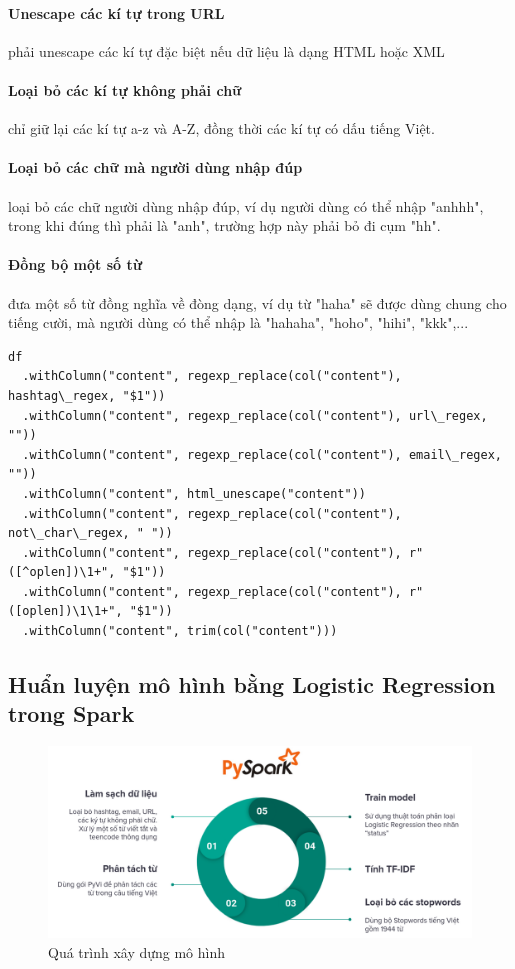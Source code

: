 \documentclass[runningheads]{llncs}
\begin{document}
\paragraph{Unescape các kí tự trong URL} phải unescape các kí tự đặc biệt nếu dữ liệu là dạng HTML hoặc XML
\paragraph{Loại bỏ các kí tự không phải chữ} chỉ giữ lại các kí tự a-z và A-Z, đồng thời các kí tự có dấu tiếng Việt.
\paragraph{Loại bỏ các chữ mà người dùng nhập đúp} loại bỏ các chữ người dùng nhập đúp, ví dụ người dùng có thể nhập "anhhh", trong khi đúng thì phải là "anh", trường hợp này phải bỏ đi cụm "hh".
\paragraph{Đồng bộ một số từ} đưa một số từ đồng nghĩa về đòng dạng, ví dụ từ "haha" sẽ được dùng chung cho tiếng cười, mà người dùng có thể nhập là "hahaha", "hoho", "hihi", "kkk",...

\begin{lstlisting}
df
  .withColumn("content", regexp_replace(col("content"), hashtag\_regex, "$1"))
  .withColumn("content", regexp_replace(col("content"), url\_regex, ""))
  .withColumn("content", regexp_replace(col("content"), email\_regex, ""))
  .withColumn("content", html_unescape("content"))
  .withColumn("content", regexp_replace(col("content"), not\_char\_regex, " "))
  .withColumn("content", regexp_replace(col("content"), r"([^oplen])\1+", "$1"))
  .withColumn("content", regexp_replace(col("content"), r"([oplen])\1\1+", "$1"))
  .withColumn("content", trim(col("content")))
\end{lstlisting}

\subsection{Huẩn luyện mô hình bằng Logistic Regression trong Spark}

\begin{figure}
\includegraphics[width=\textwidth]{pyspark_cycle.png}
\caption{Quá trình xây dựng mô hình \label{figPysparkCycle}}
\end{figure}
\end{document}

